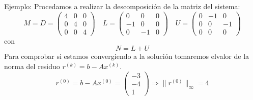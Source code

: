 \documentclass[10pt]{beamer}
\begin{document}
      \begin{frame}{Ejemplo:}
        Procedamos a realizar la descomposici\'on de la matriz del sistema:
        \small{
        $$
        M=D=\left(\begin{array}{ccc}
               4 & 0 & 0\\
               0 & 4 & 0\\
               0 & 0 & 4
              \end{array}\right) \quad L=\left(\begin{array}{ccc}
               0 & 0 & 0\\
               -1 & 0 & 0\\
               0 & -1 & 0
              \end{array}\right) \quad U=\left(\begin{array}{ccc}
               0 & -1 & 0\\
               0 & 0 & -1\\
               0 & 0 & 0
              \end{array}\right)
        $$}           
        con        
        $$
        N=L+U
        $$
        Para comprobar si estamos convergiendo a la soluci\'on tomaremos elvalor de la norma del residuo $r^{(k)} = b - Ax^{(k)}$.
        $$        
        r^{(0)}	=b-Ax^{(0)} = \left(\begin{array}{c}
        -3\\
        -4\\
        1
        \end{array}\right) \Rightarrow \|r^{(0)}\|_\infty = 4
        $$
      \end{frame}   
\end{document}
